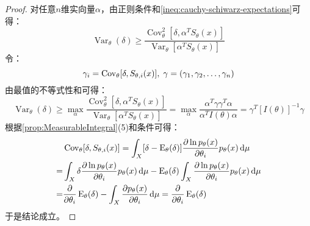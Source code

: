 \begin{proof}
	对任意$n$维实向量$\alpha$，由正则条件和\cref{ineq:cauchy-schiwarz-expectations}可得：
	\begin{equation*}
		\operatorname{Var}_{\theta}(\delta)\geqslant\frac{\operatorname{Cov}_{\theta}^2[\delta,\alpha^TS_{\theta}(x)]}{\operatorname{Var}_{\theta}[\alpha^TS_{\theta}(x)]}
	\end{equation*}
	令：
	\begin{equation*}
		\gamma_i=\operatorname{Cov}_{\theta}[\delta,S_{\theta,i}(x)],\;\gamma=(\gamma_1, \gamma_2, \dots, \gamma_{n})
	\end{equation*}
	由最值的不等式性和可得：
	\begin{equation*}
		\operatorname{Var}_{\theta}(\delta)\geqslant\max_{\alpha}\frac{\operatorname{Cov}_{\theta}^2[\delta,\alpha^TS_{\theta}(x)]}{\operatorname{Var}_{\theta}[\alpha^TS_{\theta}(x)]}=\max_{\alpha}\frac{\alpha^T\gamma\gamma^T\alpha}{\alpha^TI(\theta)\alpha}=\gamma^T[I(\theta)]^{-1}\gamma
	\end{equation*}
	根据\cref{prop:MeasurableIntegral}(5)和条件可得：
	\begin{align*}
		&\operatorname{Cov}_{\theta}[\delta,S_{\theta,i}(x)]=\int_{X}[\delta-\operatorname{E}_{\theta}(\delta)]\frac{\partial\ln p_{\theta}(x)}{\partial\theta_i}p_{\theta}(x)\mathop{}\!\mathrm{d}\mu \\
		=&\int_{X}\delta\frac{\partial\ln p_{\theta}(x)}{\partial\theta_i}p_{\theta}(x)\mathop{}\!\mathrm{d}\mu-\operatorname{E}_{\theta}(\delta)\int_{X}\frac{\partial\ln p_{\theta}(x)}{\partial\theta_i}p_{\theta}(x)\mathop{}\!\mathrm{d}\mu \\
		=&\frac{\partial}{\partial\theta_i}\operatorname{E}_{\theta}(\delta)-\int_{X}\frac{\partial p_{\theta}(x)}{\partial\theta_i}\mathop{}\!\mathrm{d}\mu=\frac{\partial}{\partial\theta_i}\operatorname{E}_{\theta}(\delta)
	\end{align*}
	于是结论成立。
\end{proof}